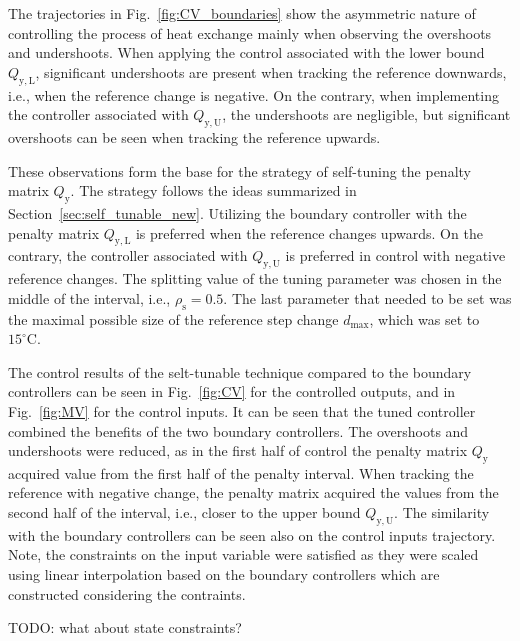 \documentclass[preprint,12pt]{elsarticle}
\begin{document}
The trajectories in Fig.~\ref{fig:CV_boundaries} show the asymmetric nature of controlling the process of heat exchange mainly when observing the overshoots and undershoots. When applying the control associated with the lower bound $Q_\mathrm{y, L}$, significant undershoots are present when tracking the reference downwards, i.e., when the reference change is negative. On the contrary, when implementing the controller associated with $Q_\mathrm{y, U}$, the undershoots are negligible, but significant overshoots can be seen when tracking the reference upwards.

These observations form the base for the strategy of self-tuning the penalty matrix $Q_\mathrm{y}$. The strategy follows the ideas summarized in Section~\ref{sec:self_tunable_new}. Utilizing the boundary controller with the penalty matrix $Q_\mathrm{y,L}$ is preferred when the reference changes upwards. On the contrary, the controller associated with $Q_\mathrm{y,U}$ is preferred in control with negative reference changes. The splitting value of the tuning parameter was chosen in the middle of the interval, i.e., $\rho_{\mathrm{s}} = 0.5$. The last parameter that needed to be set was the maximal possible size of the reference step change $d_{\max}$, which was set to $15^{\circ}\mathrm{C}$. 

The control results of the selt-tunable technique compared to the boundary controllers can be seen in Fig.~\ref{fig:CV} for the controlled outputs, and in Fig.~\ref{fig:MV} for the control inputs. It can be seen that the tuned controller combined the benefits of the two boundary controllers. The overshoots and undershoots were reduced, as in the first half of control the penalty matrix $Q_\mathrm{y}$ acquired value from the first half of the penalty interval. When tracking the reference with negative change, the penalty matrix acquired the values from the second half of the interval, i.e., closer to the upper bound $Q_\mathrm{y,U}$. 
The similarity with the boundary controllers can be seen also on the control inputs trajectory. Note, the constraints on the input variable were satisfied as they were scaled using linear interpolation based on the boundary controllers which are constructed considering the contraints. 

TODO: what about state constraints?
\end{document}
